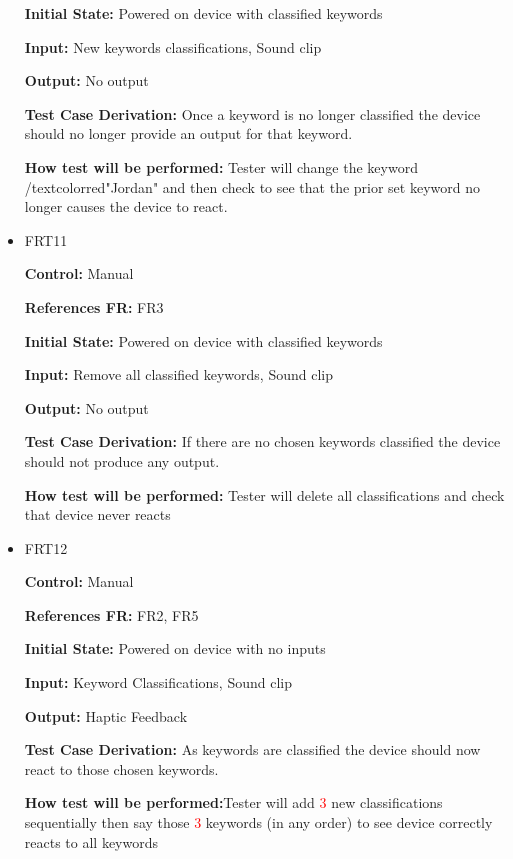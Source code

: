 \documentclass[12pt, titlepage]{article}
\begin{document}
\begin{itemize}
\textbf{Initial State:} Powered on device with classified keywords
					
\textbf{Input:} New keywords classifications, Sound clip
					
\textbf{Output:} No output

\textbf{Test Case Derivation:} Once a keyword is no longer classified the device should no longer provide an output for that keyword.
					
\textbf{How test will be performed:} Tester will change the keyword /textcolor{red}{"Jordan"} and then check to see that the prior set keyword no longer causes the device to react.


\item{FRT11}

\textbf{Control:} Manual 

\textbf{References FR:} FR3 					

\textbf{Initial State:} Powered on device with classified keywords
					
\textbf{Input:} Remove all classified keywords, Sound clip
					
\textbf{Output:} No output

\textbf{Test Case Derivation:} If there are no chosen keywords classified the device should not produce any output.
					
\textbf{How test will be performed:} Tester will delete all classifications and check that device never reacts


\item{FRT12}

\textbf{Control:} Manual

\textbf{References FR:} FR2, FR5 					

\textbf{Initial State:} Powered on device with no inputs
					
\textbf{Input:} Keyword Classifications, Sound clip
					
\textbf{Output:} Haptic Feedback

\textbf{Test Case Derivation:} As keywords are classified the device should now react to those chosen keywords.
					
\textbf{How test will be performed:}Tester will add \textcolor{red}{ 3} new classifications sequentially then say those \textcolor{red}{3} keywords (in any order) to see device correctly reacts to all keywords


\end{itemize}
\end{document}
